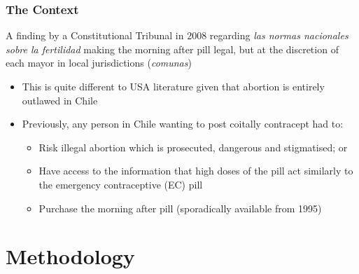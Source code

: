 \documentclass[10pt,letterpaper,subeqn]{beamer}
\begin{document}
\begin{frame}[label=Context]
\frametitle{The Context}
A finding by a Constitutional Tribunal in 2008 regarding \emph{las normas nacionales sobre la fertilidad} making the morning after pill legal, but at the discretion of each mayor in local jurisdictions (\emph{comunas})
\vspace{5mm}
\begin{itemize}
\item This is quite different to USA literature given that abortion is entirely outlawed in Chile
\item Previously, any person in Chile wanting to post coitally contracept had to:
\begin{itemize}
\item Risk illegal abortion which is prosecuted, dangerous and stigmatised; or
\item Have access to the information that high doses of the pill act similarly to the emergency contraceptive (EC) pill
\item Purchase the morning after pill (sporadically available from 1995)
\end{itemize}
\end{itemize}
\hyperlink{PAE}{}
\end{frame}


\section{Methodology}
\end{document}
